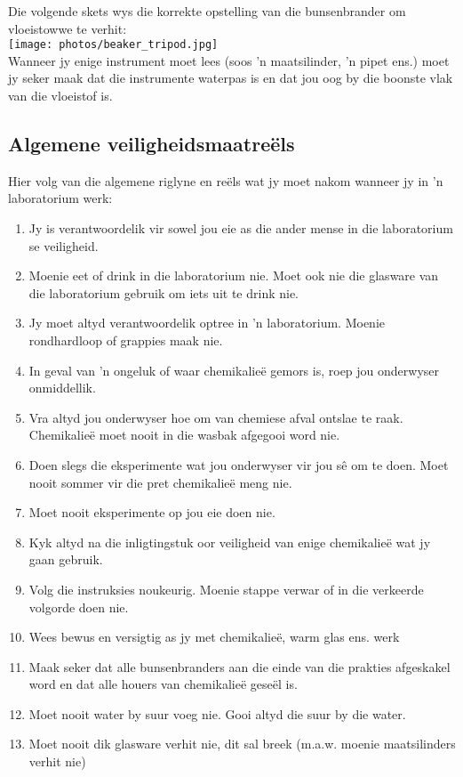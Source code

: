 Die volgende skets wys die korrekte opstelling van die bunsenbrander om vloeistowwe te verhit:\\
\texttt{[image: photos/beaker\_tripod.jpg]}\\
Wanneer jy enige instrument moet lees (soos  'n maatsilinder,  'n pipet ens.) moet jy seker maak dat die instrumente waterpas is en dat jou oog by die boonste vlak van die vloeistof is.

\subsection*{Algemene veiligheidsmaatreëls}
            \nopagebreak
Hier volg van die algemene riglyne en reëls wat jy moet nakom wanneer jy in  'n laboratorium werk:
\begin{enumerate}[noitemsep, label=\textbf{\arabic*}. ] 
\item Jy is verantwoordelik vir sowel jou eie as die ander mense in die laboratorium se veiligheid.
\item Moenie eet of drink in die laboratorium nie. Moet ook nie die glasware van die laboratorium gebruik om iets uit te drink nie.
\item Jy moet altyd verantwoordelik optree in  'n laboratorium. Moenie rondhardloop of grappies maak nie.
\item In geval van  'n ongeluk of waar chemikalieë gemors is, roep jou onderwyser onmiddellik.
\item Vra altyd jou onderwyser hoe om van chemiese afval ontslae te raak. Chemikalieë moet nooit in die wasbak afgegooi word nie.
\item Doen slegs die eksperimente wat jou onderwyser vir jou sê om te doen. Moet nooit sommer vir die pret chemikalieë meng nie.
\item Moet nooit eksperimente op jou eie doen nie. 
\item Kyk altyd na die inligtingstuk oor veiligheid van enige chemikalieë wat jy gaan gebruik. 
\item Volg die instruksies noukeurig. Moenie stappe verwar of in die verkeerde volgorde doen nie. 
\item Wees bewus en versigtig as jy met chemikalieë, warm glas ens. werk  
\item Maak seker dat alle bunsenbranders aan die einde van die prakties afgeskakel word en dat alle houers van chemikalieë geseël is.
\item Moet nooit water by suur voeg nie. Gooi altyd die suur by die water.
\item Moet nooit dik glasware verhit nie, dit sal breek (m.a.w. moenie maatsilinders verhit nie)

\end{enumerate}

